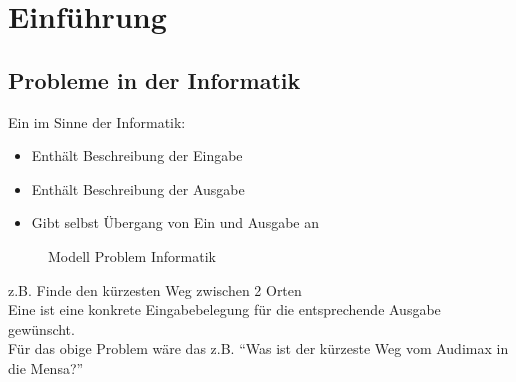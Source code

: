 \documentclass[
    ngerman,
    color=3b,
    dark_mode,
    load_common, %
    summary,
    boxarc,
]{tuda_summary}
\begin{document}
\section{Einführung}\label{1}\label{Einfuehrung}
\subsection{Probleme in der Informatik}\label{1.1}
Ein  im Sinne der Informatik:
\begin{itemize}
    \item Enthält Beschreibung der Eingabe
    \item Enthält Beschreibung der Ausgabe
    \item Gibt selbst  Übergang von Ein und Ausgabe an
\end{itemize}
\begin{figure}[ht]
    \centering
    \caption{Modell Problem Informatik}
    \label{fig:modell-problem-informatik}
\end{figure}
z.B. Finde den kürzesten Weg zwischen 2 Orten\\
Eine  ist eine konkrete Eingabebelegung für die entsprechende Ausgabe gewünscht.\\
Für das obige Problem wäre das z.B. "`Was ist der kürzeste Weg vom Audimax in die Mensa?"'
\end{document}
